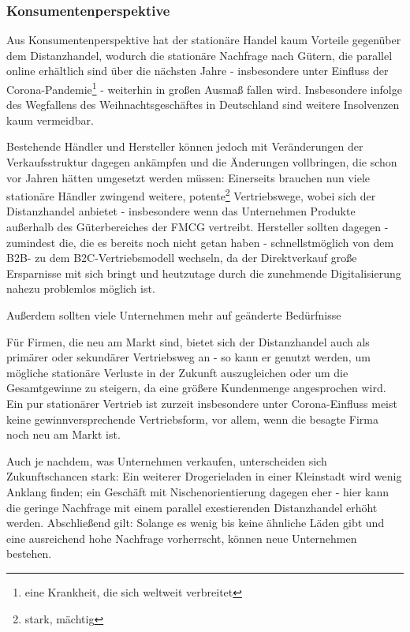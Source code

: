 \subsubsection{Konsumentenperspektive}
Aus Konsumentenperspektive hat der stationäre Handel kaum Vorteile gegenüber dem Distanzhandel, wodurch die stationäre Nachfrage nach Gütern, die parallel online erhältlich sind über die nächsten Jahre - insbesondere unter Einfluss der Corona-Pandemie\footnote{eine Krankheit, die sich weltweit verbreitet} - weiterhin in großen Ausmaß fallen wird. Insbesondere infolge des Wegfallens des Weihnachtsgeschäftes in Deutschland sind weitere Insolvenzen kaum vermeidbar.

Bestehende Händler und Hersteller können jedoch mit Veränderungen der Verkaufsstruktur dagegen ankämpfen und die Änderungen vollbringen, die schon vor Jahren hätten umgesetzt werden müssen: Einerseits brauchen nun viele stationäre Händler zwingend weitere, potente\footnote{stark, mächtig} Vertriebswege, wobei sich der Distanzhandel anbietet - insbesondere wenn das Unternehmen Produkte außerhalb des Güterbereiches der \ac{FMCG} vertreibt. Hersteller sollten dagegen - zumindest die, die es bereits noch nicht getan haben - schnellstmöglich von dem \ac{B2B}- zu dem \ac{B2C}-Vertriebsmodell wechseln, da der Direktverkauf große Ersparnisse mit sich bringt und heutzutage durch die zunehmende Digitalisierung nahezu problemlos möglich ist.

Außerdem sollten viele Unternehmen mehr auf geänderte Bedürfnisse

Für Firmen, die neu am Markt sind, bietet sich der Distanzhandel auch als primärer oder sekundärer Vertriebsweg an - so kann er genutzt werden, um mögliche stationäre Verluste in der Zukunft auszugleichen oder um die Gesamtgewinne zu steigern, da eine größere Kundenmenge angesprochen wird. Ein pur stationärer Vertrieb ist zurzeit insbesondere unter Corona-Einfluss meist keine gewinnversprechende Vertriebsform, vor allem, wenn die besagte Firma noch neu am Markt ist.

Auch je nachdem, was Unternehmen verkaufen, unterscheiden sich Zukunftschancen stark: Ein weiterer Drogerieladen in einer Kleinstadt wird wenig Anklang finden; ein Geschäft mit Nischenorientierung dagegen eher - hier kann die geringe Nachfrage mit einem parallel exestierenden Distanzhandel erhöht werden. %
Abschließend gilt: Solange es wenig bis keine ähnliche Läden gibt und eine ausreichend hohe Nachfrage vorherrscht, können neue Unternehmen bestehen.

